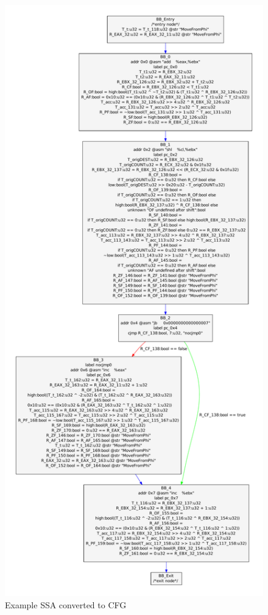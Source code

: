\begin{figure}[!p]
  \begin{center}
    \includegraphics[height=.9\textheight]{chap-examples/ssaconvcfg.pdf}
  \end{center}
  \caption{Example SSA converted to CFG}
  \label{fig:ssaconvcfg}
\end{figure}

